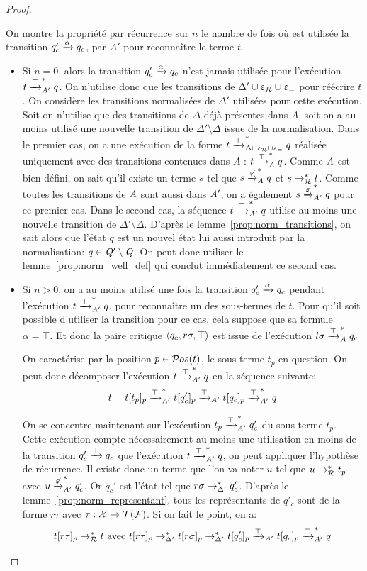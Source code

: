 \begin{proof}
\begin{enumerate}
  On montre la propriété par récurrence sur $n$ le nombre de fois où est utilisée la transition $q'_c \xrightarrow{\alpha} q_c$,
  par $A'$ pour reconnaître le terme $t$.

  \begin{itemize}
  \item Si $n = 0$, alors la transition $q'_c \xrightarrow{\alpha} q_c$ n'est jamais utilisée pour l'exécution $t \xrightarrow{\top}^*_{\mathit A'}q $.
    On n'utilise donc que les transitions de $\Delta'\cup\upvarepsilon_{\mathcal R}\cup\upvarepsilon_{=}$ pour réécrire $t$. On considère les transitions
    normalisées de $\Delta'$ utilisées pour cette exécution. Soit on n'utilise que des transitions de $\Delta$ déjà présentes dans $A$,
    soit on a au moins utilisé une nouvelle transition de $\Delta'\setminus\Delta$ issue de la normalisation.
    Dans le premier cas, on a une exécution de la forme $t \xrightarrow{\top}^*_{\Delta\cup\upvarepsilon_{\mathcal R}\cup\upvarepsilon_{=}} q$ réalisée uniquement avec des transitions
    contenues dans $A$ : $t \xrightarrow{\top}^*_{\mathit A} q$. Comme $\mathit A$ est bien défini, on sait qu'il existe un terme $s$ tel que $s \xrightarrow{\not\varepsilon}_\mathit A^* q$ et 
     $s \rightarrow^*_\mathcal R t$. Comme toutes les transitions de $\mathit A$ sont aussi dans $\mathit A'$, on a également $s \xrightarrow{\not\varepsilon}_{\mathit A'}^* q$ pour ce premier cas.
    Dans le second cas, la séquence $t \xrightarrow{\top}^*_{\mathit A'}q $ utilise au moins une nouvelle transition de $\Delta'\setminus\Delta$.
    D'après le lemme~\ref{prop:norm_transitions}, on sait alors que l'état $q$ est un nouvel état lui aussi introduit par la normalisation:
    $q \in \mathit Q'\setminus\mathit Q$. On peut donc utiliser le lemme~\ref{prop:norm_well_def} qui conclut immédiatement ce second cas.  

  \item Si $n > 0$, on a au moins utilisé une fois la transition $q'_c \xrightarrow{\alpha} q_c$ pendant l'exécution $t \xrightarrow{\top}^*_{\mathit A'}q $, pour
    reconnaître un des sous-termes de $t$. Pour qu'il soit possible d'utiliser la transition pour ce cas, cela suppose que sa formule $\alpha = \top$.
    Et donc la paire critique $\langle q_c, r\sigma, \top\rangle$ est issue de l'exécution $l\sigma \xrightarrow{\top}_\mathit A^* q_c$

    On caractérise par la position $p \in \mathcal{ P}os(t)$, le sous-terme $t_p$ en question.
    On peut donc décomposer l'exécution $t \xrightarrow{\top}^*_{\mathit A'}q$ en la séquence suivante:
    \[t = t[t_p]_p \xrightarrow{\top}^*_{\mathit A'} t[q_c']_p \xrightarrow{\top}_{A'} t[q_c]_p \xrightarrow{\top}^*_{\mathit A'} q\]
 
    On se concentre maintenant sur l'exécution $t_p\xrightarrow{\top}^*_{\mathit A'} q_c'$ du sous-terme $t_p$. Cette
    exécution compte nécessairement au moins une utilisation en moins de la transition $q_c' \xrightarrow{\top} q_c$
    que l'exécution $t \xrightarrow{\top}^*_{\mathit A'}q$, on peut appliquer l'hypothèse de récurrence. Il existe donc
    un terme que l'on va noter $u$ tel que $u \rightarrow^*_\mathcal R t_p$ avec $u \xrightarrow{\not\varepsilon}_{\mathit A'}^* q_c'$.
    Or $q_c'$ est l'état tel que $r\sigma \rightarrow^*_{\Delta'} q'_c$. D'après le lemme~\ref{prop:norm_representant},
    tous les représentants de $q'_c$ sont de la forme $r\tau$ avec $\tau : \mathcal X \rightarrow \mathcal{T(F)}$.
    Si on fait le point, on a:
    \[t[r\tau]_p \rightarrow^*_\mathcal R t\textrm{ avec }  t[r\tau]_p \rightarrow^*_{\Delta'} t[r\sigma]_p \rightarrow^*_{\Delta'} t[q_c']_p \xrightarrow{\top}_{\mathit A'} t[q_c]_p \xrightarrow{\top}^*_{\mathit A'} q\]
  

\end{itemize}
\end{enumerate}
\end{proof}
